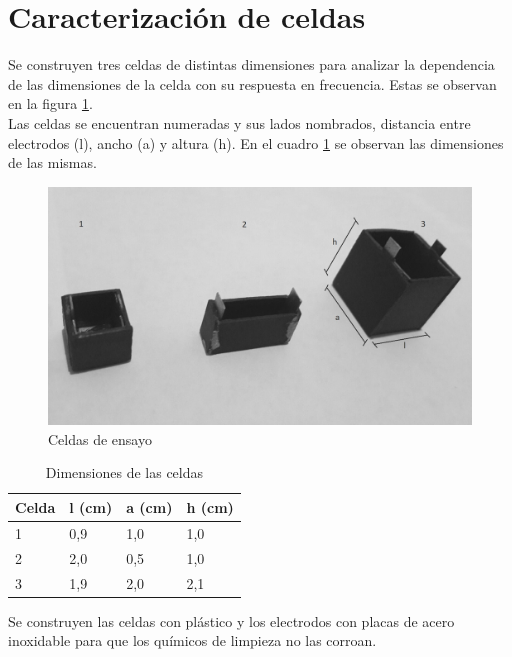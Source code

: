 \section{Caracterización de celdas}
Se construyen tres celdas de distintas dimensiones para analizar la dependencia de las dimensiones de la celda con su respuesta en frecuencia. Estas se observan en la figura \ref{fig:celdas}.\\

Las celdas se encuentran numeradas y sus lados nombrados, distancia entre electrodos (l), ancho (a) y altura (h). En el cuadro \ref{tabla:celdas_dimen} se observan las dimensiones de las mismas.\\

\begin{figure}[H]
\centering
\includegraphics[width=1\textwidth]{Celda/celdas_num.jpg}
\caption{Celdas de ensayo}
\label{fig:celdas}
\end{figure}

\begin{table}[htp]
\centering
\caption{Dimensiones de las celdas}
\label{tabla:celdas_dimen}

\begin{tabular}{|l|l|l|l|}
	\hline
	Celda & l (cm) & a (cm)& h (cm)  \\ \hline
	1 & 0,9 & 1,0 & 1,0\\ \hline
    2 & 2,0 & 0,5 & 1,0\\ \hline
    3 & 1,9  & 2,0 & 2,1\\ \hline
 
\end{tabular}
\end{table}

Se construyen las celdas con plástico y los electrodos con placas de acero inoxidable para que los químicos de limpieza no las corroan.\\

